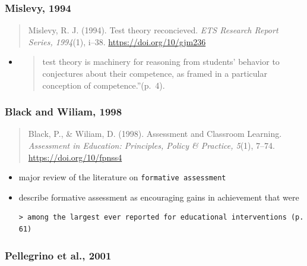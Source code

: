 \documentclass[
]{book}
\begin{document}
\hypertarget{mislevy-1994}{%
\subsubsection*{Mislevy, 1994}\label{mislevy-1994}}

\begin{quote}
Mislevy, R. J. (1994). Test theory reconcieved. \emph{ETS Research Report Series, 1994}(1), i--38. \url{https://doi.org/10/gjm236}
\end{quote}

\begin{itemize}
\item
  \begin{quote}
  test theory is machinery for reasoning from students' behavior to conjectures about their competence, as framed in a particular conception of competence.''(p.~4).
  \end{quote}
\end{itemize}

\hypertarget{black-and-wiliam-1998}{%
\subsubsection*{Black and Wiliam, 1998}\label{black-and-wiliam-1998}}

\begin{quote}
Black, P., \& Wiliam, D. (1998). Assessment and Classroom Learning. \emph{Assessment in Education: Principles, Policy \& Practice, 5}(1), 7--74. \url{https://doi.org/10/fpnss4}
\end{quote}

\begin{itemize}
\item
  major review of the literature on \texttt{formative\ assessment}\\
\item
  describe formative assessment as encouraging gains in achievement that were

\begin{verbatim}
> among the largest ever reported for educational interventions (p. 61)
\end{verbatim}
\end{itemize}

\hypertarget{pellegrino-et-al.-2001}{%
\subsubsection*{Pellegrino et al., 2001}\label{pellegrino-et-al.-2001}}
\end{document}
